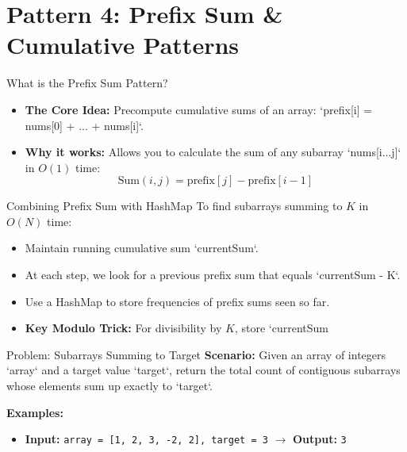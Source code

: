 \section{Pattern 4: Prefix Sum \& Cumulative Patterns}

\begin{frame}[c]{\empty}
    \begin{center}
        \Large\textbf{\secname}
    \end{center}
\end{frame}

\begin{frame}{What is the Prefix Sum Pattern?}
  \begin{itemize}
    \item \textbf{The Core Idea:} Precompute cumulative sums of an array: `prefix[i] = nums[0] + ... + nums[i]`.
    \item \textbf{Why it works:} Allows you to calculate the sum of any subarray `nums[i...j]` in $O(1)$ time:
      $$\text{Sum}(i, j) = \text{prefix}[j] - \text{prefix}[i-1]$$
  \end{itemize}
\end{frame}

\begin{frame}{Combining Prefix Sum with HashMap}
  To find subarrays summing to $K$ in $O(N)$ time:
  \begin{itemize}
    \item Maintain running cumulative sum `currentSum`.
    \item At each step, we look for a previous prefix sum that equals `currentSum - K`.
    \item Use a HashMap to store frequencies of prefix sums seen so far.
    \item \textbf{Key Modulo Trick:} For divisibility by $K$, store `currentSum %
  \end{itemize}
\end{frame}

\begin{frame}[fragile]{Problem: Subarrays Summing to Target}
  \textbf{Scenario:}
  Given an array of integers `array` and a target value `target`, return the total count of contiguous subarrays whose elements sum up exactly to `target`.
  
  \vspace{0.3cm}
  \textbf{Examples:}
  \begin{itemize}
    \item \textbf{Input:} \texttt{array = [1, 2, 3, -2, 2], target = 3} $\rightarrow$ \textbf{Output:} \texttt{3}
  \end{itemize}
\end{frame}

